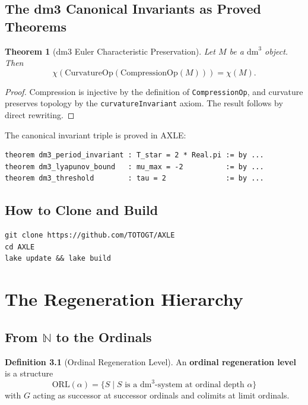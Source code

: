 \documentclass[11pt, twoside, openright]{book}
\theoremstyle{plain}
\newtheorem{theorem}{Theorem}[chapter]
\theoremstyle{definition}
\newtheorem{definition}[theorem]{Definition}
\newcommand{\dm}{\mathrm{dm}^3}
\begin{document}
\section{The dm3 Canonical Invariants as Proved Theorems}

\begin{theorem}[dm3 Euler Characteristic Preservation]
Let $M$ be a $\dm$ object. Then
\[
\chi(\mathrm{CurvatureOp}(\mathrm{CompressionOp}(M))) = \chi(M).
\]
\end{theorem}
\begin{proof}
Compression is injective by the definition of \texttt{CompressionOp},
and curvature preserves topology by the \texttt{curvatureInvariant} axiom.
The result follows by direct rewriting.
\end{proof}

The canonical invariant triple is proved in AXLE:
\begin{verbatim}
theorem dm3_period_invariant : T_star = 2 * Real.pi := by ...
theorem dm3_lyapunov_bound   : mu_max = -2          := by ...
theorem dm3_threshold        : tau = 2              := by ...
\end{verbatim}

\section{How to Clone and Build}

\begin{verbatim}
git clone https://github.com/TOTOGT/AXLE
cd AXLE
lake update && lake build
\end{verbatim}

\chapter{The Regeneration Hierarchy}

\section{From $\mathbb{N}$ to the Ordinals}

\begin{definition}[Ordinal Regeneration Level]
An \textbf{ordinal regeneration level} is a structure
\[
\mathrm{ORL}(\alpha) =
  \{S \mid S \text{ is a dm}^3\text{-system at ordinal depth } \alpha\}
\]
with $G$ acting as successor at successor ordinals and colimits at
limit ordinals.
\end{definition}
\end{document}
